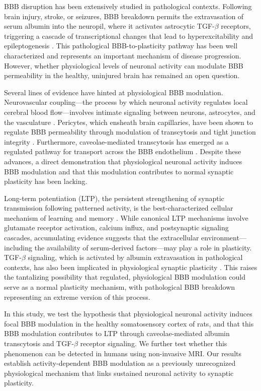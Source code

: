 \documentclass[11pt]{article}
\begin{document}
BBB disruption has been extensively studied in pathological contexts. Following brain injury, stroke, or seizures, BBB breakdown permits the extravasation of serum albumin into the neuropil, where it activates astrocytic TGF-$\beta$ receptors, triggering a cascade of transcriptional changes that lead to hyperexcitability and epileptogenesis \citep{friedman2009blood, ivens2007tgf}. This pathological BBB-to-plasticity pathway has been well characterized and represents an important mechanism of disease progression. However, whether physiological levels of neuronal activity can modulate BBB permeability in the healthy, uninjured brain has remained an open question.

Several lines of evidence have hinted at physiological BBB modulation. Neurovascular coupling---the process by which neuronal activity regulates local cerebral blood flow---involves intimate signaling between neurons, astrocytes, and the vasculature \citep{iadecola2017neurovascular, attwell2010glial}. Pericytes, which ensheath brain capillaries, have been shown to regulate BBB permeability through modulation of transcytosis and tight junction integrity \citep{armulik2010pericytes}. Furthermore, caveolae-mediated transcytosis has emerged as a regulated pathway for transport across the BBB endothelium \citep{andreone2017blood, knowland2014stepwise}. Despite these advances, a direct demonstration that physiological neuronal activity induces BBB modulation and that this modulation contributes to normal synaptic plasticity has been lacking.

Long-term potentiation (LTP), the persistent strengthening of synaptic transmission following patterned activity, is the best-characterized cellular mechanism of learning and memory \citep{bliss1973long}. While canonical LTP mechanisms involve glutamate receptor activation, calcium influx, and postsynaptic signaling cascades, accumulating evidence suggests that the extracellular environment---including the availability of serum-derived factors---may play a role in plasticity. TGF-$\beta$ signaling, which is activated by albumin extravasation in pathological contexts, has also been implicated in physiological synaptic plasticity \citep{toth2019tgfbeta}. This raises the tantalizing possibility that regulated, physiological BBB modulation could serve as a normal plasticity mechanism, with pathological BBB breakdown representing an extreme version of this process.

In this study, we test the hypothesis that physiological neuronal activity induces focal BBB modulation in the healthy somatosensory cortex of rats, and that this BBB modulation contributes to LTP through caveolae-mediated albumin transcytosis and TGF-$\beta$ receptor signaling. We further test whether this phenomenon can be detected in humans using non-invasive MRI. Our results establish activity-dependent BBB modulation as a previously unrecognized physiological mechanism that links sustained neuronal activity to synaptic plasticity.
\end{document}
